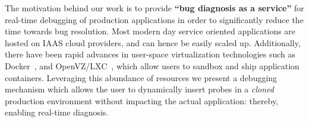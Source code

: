 


\noindent
The motivation behind our work is to provide \textbf{``bug diagnosis as a service''} for real-time debugging of production applications in order to significantly reduce the time towards bug resolution.
Most modern day service oriented applications are hosted on IAAS cloud providers, and can hence be easily scaled  up. 
Additionally, there have been rapid advances in user-space virtualization technologies such as Docker~\cite{docker}, and OpenVZ/LXC~\cite{openvz,lxc}, which allow users to sandbox and ship application containers. 
Leveraging this abundance of resources we present a debugging mechanism which allows the user to dynamically insert probes in a \emph{cloned} production environment without impacting the actual application: thereby, enabling real-time diagnosis.

